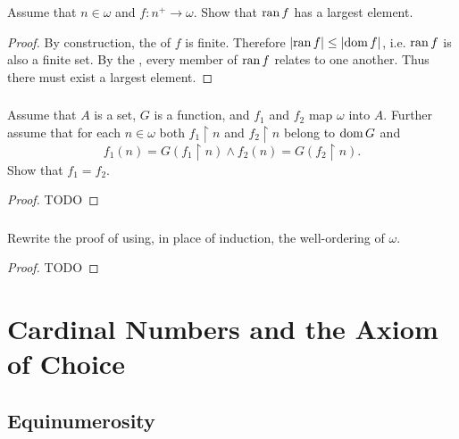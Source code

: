 \documentclass{report}
\begin{document}
  Assume that $n \in \omega$ and $f \colon n^+ \rightarrow \omega$.
  Show that $\mathop{\text{ran}}{f}$ has a largest element.

  \begin{proof}

    By construction, the  of $f$ is finite.
    Therefore $\left|\mathop{\text{ran}}{f}\right| \leq \left|\mathop{\text{dom}}{f}\right|$, i.e. $\mathop{\text{ran}}{f}$ is also a
      finite set.
    By the , every member of
      $\mathop{\text{ran}}{f}$ relates to one another.
    Thus there must exist a largest element.

  \end{proof}

\subsection{}%

  Assume that $A$ is a set, $G$ is a function, and $f_1$ and $f_2$ map $\omega$
    into $A$.
  Further assume that for each $n \in \omega$ both $f_1 \restriction n$ and
    $f_2 \restriction n$ belong to $\mathop{\text{dom}}{G}$ and
    $$f_1(n) = G(f_1 \restriction n) \land f_2(n) = G(f_2 \restriction n).$$
  Show that $f_1 = f_2$.

  \begin{proof}
    TODO
  \end{proof}

\subsection{}%

  Rewrite the proof of  using, in place of induction,
    the well-ordering of $\omega$.

  \begin{proof}
    TODO
  \end{proof}

\setcounter{chapter}{5}
\chapter{Cardinal Numbers and the Axiom of Choice}%

\section{Equinumerosity}%
\end{document}
